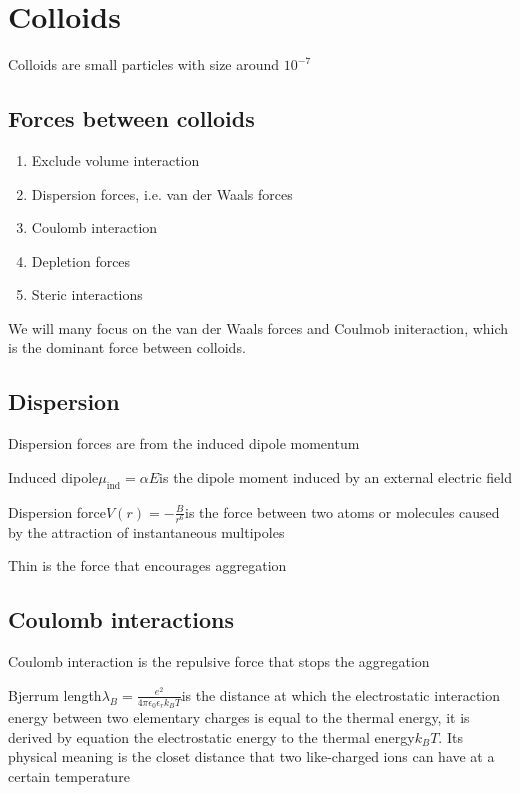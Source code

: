 \documentclass[12pt,a4paper]{article}
\begin{document}
\section{Colloids}
Colloids are small particles with size around $10^{-7}$
\subsection{Forces between colloids}
\begin{enumerate}
    \item Exclude volume interaction
    \item Dispersion forces, i.e. van der Waals forces
    \item Coulomb interaction
    \item Depletion forces
    \item Steric interactions
\end{enumerate}
We will many focus on the van der Waals forces and Coulmob initeraction, which is the dominant force between colloids.
\subsection{Dispersion}
Dispersion forces are from the induced dipole momentum
\begin{definition}
    {Induced dipole}{$\mu_{\text {ind}}=\alpha E$}{is the dipole moment induced by an external electric field}
\end{definition}

\begin{definition}
    {Dispersion force}{$V(r)=-\frac{B}{r^6}$}{is the force between two atoms or molecules caused by the attraction of instantaneous multipoles}
\end{definition}

Thin is the force that encourages aggregation
\subsection{Coulomb interactions}
Coulomb interaction is the repulsive force that stops the aggregation

\begin{definition}
    {Bjerrum length}{$\lambda_B=\frac{e^2}{4 \pi \epsilon_0 \epsilon_r k_B T}$}{is the distance at which the electrostatic interaction energy between two elementary charges is equal to the thermal energy, it is derived by equation the electrostatic energy to the thermal energy$k_B T$. Its physical meaning is the closet distance that two like-charged ions can have at a certain temperature}
\end{definition}
\end{document}

